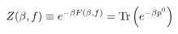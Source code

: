 \begin{equation}
Z(\beta,f) \equiv e^{-\beta F(\beta,f)}={\rm Tr}\left( e^{-\beta p^0} \right) 
\label{partf}
\end{equation}

